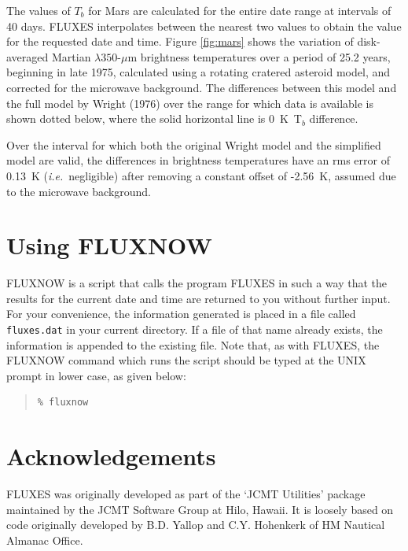 \documentclass[11pt,twoside]{article}
\newenvironment{myquote}{\begin{quote}\begin{small}}{\end{small}\end{quote}}
\newcommand{\htmladdnormallink}[2]{#1}
\newcommand{\xlabel}[1]{}
\renewcommand{\_}{\texttt{\symbol{95}}}
\begin{document}
The values of $T_b$ for Mars are calculated for the entire date range
at intervals of 40 days. FLUXES interpolates between the nearest two
values to obtain the value for the requested date and time.
Figure \ref{fig:mars} shows the variation of disk-averaged Martian $\lambda350$-$\mu$m
brightness temperatures over a period of 25.2 years, beginning in late 1975,
calculated using a rotating cratered asteroid model, and corrected for the
microwave background. The differences between this model and the full model
by Wright (1976) over the range for which data is available is shown
dotted below, where the solid horizontal line is 0~K~T$_b$ difference.

Over the interval for which
both the original Wright model and the simplified model are valid, the
differences in brightness temperatures have an rms error of 0.13~K
({\em i.e.}\ negligible) after removing a constant offset of -2.56~K, assumed
due to the microwave background.

\section{Using FLUXNOW}
\xlabel{FLUXNOW}
\label{sec:fluxnow}


FLUXNOW is a script that calls the program FLUXES in such a way that
the results for the current date and time are returned to you without
further input.  For your convenience, the information generated is
placed in a file called {\tt{fluxes.dat}} in your current directory.
If a file of that name already exists, the information is appended to
the existing file.  Note that, as with FLUXES, the FLUXNOW command
which runs the script should be typed at the UNIX prompt in lower case,
as given below:

\begin{myquote}
\begin{verbatim}
% fluxnow
\end{verbatim}
\end{myquote}

\section{Acknowledgements}
\xlabel{ACKNOWLEDGEMENTS}
\label{sec:acknowledgements}

FLUXES was originally developed as part of the
`\htmladdnormallink{JCMT}{http://www.jach.hawaii.edu/JCMT/home.html} Utilities'
package maintained by the \htmladdnormallink{JCMT Software Group}
{http://www.jach.hawaii.edu/jcmt_sw/} at Hilo, Hawaii. It is
loosely based on code originally developed by B.D. Yallop and C.Y. Hohenkerk
of \htmladdnormallink{HM Nautical Almanac Office}{http://www.ast.cam.ac.uk/}.
\end{document}
